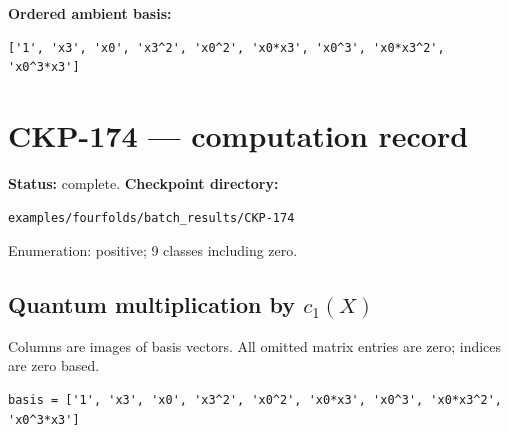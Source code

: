 \documentclass[10pt,a4paper]{article}
\begin{document}
\textbf{Ordered ambient basis:}
\begin{lstlisting}
['1', 'x3', 'x0', 'x3^2', 'x0^2', 'x0*x3', 'x0^3', 'x0*x3^2', 'x0^3*x3']
\end{lstlisting}

\clearpage\section*{CKP-174 --- computation record}
\textbf{Status:} complete.
\textbf{Checkpoint directory:}
\begin{lstlisting}
examples/fourfolds/batch_results/CKP-174
\end{lstlisting}

Enumeration: positive; 9 classes including zero.
\subsection*{Quantum multiplication by $c_1(X)$}
Columns are images of basis vectors. All omitted matrix entries are zero; indices are zero based.

\begin{lstlisting}
basis = ['1', 'x3', 'x0', 'x3^2', 'x0^2', 'x0*x3', 'x0^3', 'x0*x3^2', 'x0^3*x3']
\end{lstlisting}
\end{document}
